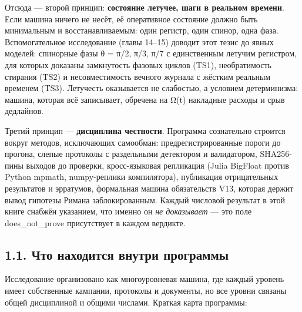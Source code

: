 \documentclass[11pt,a4paper]{article}
\begin{document}
Отсюда — второй принцип: \textbf{состояние летучее, шаги в реальном времени}. Если машина ничего не несёт, её оперативное состояние должно быть минимальным и восстанавливаемым: один регистр, один спинор, одна фаза. Вспомогательное исследование (главы 14–15) доводит этот тезис до явных моделей: спинорные фазы θ = π/2, π/3, π/7 с единственным летучим регистром, для которых доказаны замкнутость фазовых циклов (TS1), необратимость стирания (TS2) и несовместимость вечного журнала с жёстким реальным временем (TS3). Летучесть оказывается не слабостью, а условием детерминизма: машина, которая всё записывает, обречена на Ω(t) накладные расходы и срыв дедлайнов.

Третий принцип — \textbf{дисциплина честности}. Программа сознательно строится вокруг методов, исключающих самообман: предрегистрированные пороги до прогона, слепые протоколы с раздельными детектором и валидатором, SHA256-пины выходов до проверки, кросс-языковая репликация (Julia BigFloat против Python mpmath, numpy-реплики компилятора), публикация отрицательных результатов и эрратумов, формальная машина обязательств V13, которая держит вывод гипотезы Римана заблокированным. Каждый числовой результат в этой книге снабжён указанием, что именно он \emph{не доказывает} — это поле does\_not\_prove присутствует в каждом вердикте.

\subsection{1.1. Что находится внутри программы}

Исследование организовано как многоуровневая машина, где каждый уровень имеет собственные кампании, протоколы и документы, но все уровни связаны общей дисциплиной и общими числами. Краткая карта программы:
\end{document}
